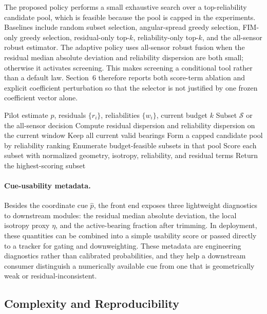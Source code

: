 \documentclass[drones,article,submit,pdftex,moreauthors]{Definitions/mdpi}
\begin{document}
The proposed policy performs a small exhaustive search over a top-reliability candidate pool, which is feasible because the pool is capped in the experiments. Baselines include random subset selection, angular-spread greedy selection, FIM-only greedy selection, residual-only top-$k$, reliability-only top-$k$, and the all-sensor robust estimator. The adaptive policy uses all-sensor robust fusion when the residual median absolute deviation and reliability dispersion are both small; otherwise it activates screening. This makes screening a conditional tool rather than a default law. Section~6 therefore reports both score-term ablation and explicit coefficient perturbation so that the selector is not justified by one frozen coefficient vector alone.

\begin{algorithm}[!htbp]
\caption{Adaptive Budget Screening}
\label{alg:screening}
\begin{algorithmic}
\Require Pilot estimate $\hat{p}$, residuals $\{r_i\}$, reliabilities $\{w_i\}$, current budget $k$
\Ensure Subset $\mathcal{S}$ or the all-sensor decision
\State Compute residual dispersion and reliability dispersion on the current window
    \State Keep all current valid bearings
\Else
    \State Form a capped candidate pool by reliability ranking
    \State Enumerate budget-feasible subsets in that pool
    \State Score each subset with normalized geometry, isotropy, reliability, and residual terms
    \State Return the highest-scoring subset
\EndIf
\end{algorithmic}
\end{algorithm}

\paragraph{Cue-usability metadata.}
Besides the coordinate cue $\hat{p}$, the front end exposes three lightweight diagnostics to downstream modules: the residual median absolute deviation, the local isotropy proxy $\eta$, and the active-bearing fraction after trimming. In deployment, these quantities can be combined into a simple usability score or passed directly to a tracker for gating and downweighting. These metadata are engineering diagnostics rather than calibrated probabilities, and they help a downstream consumer distinguish a numerically available cue from one that is geometrically weak or residual-inconsistent.

\subsection{Complexity and Reproducibility}
\end{document}
